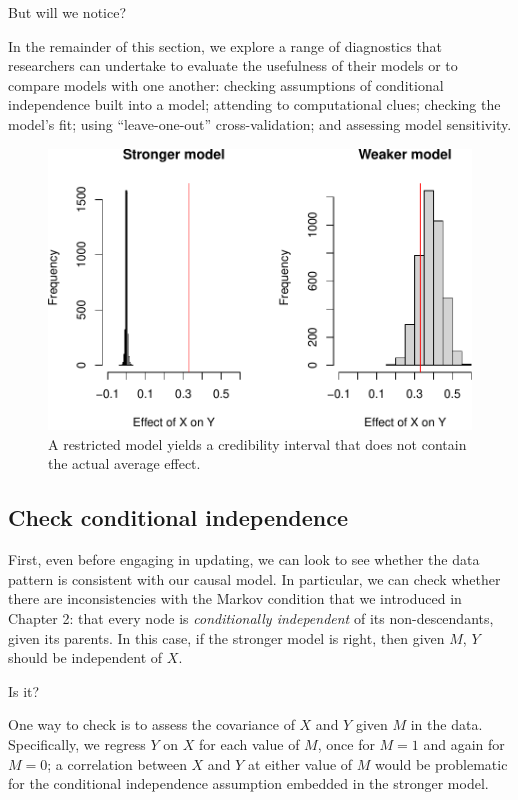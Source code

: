 \documentclass[
  12pt,
]{book}
\begin{document}
But will we notice?

In the remainder of this section, we explore a range of diagnostics that researchers can undertake to evaluate the usefulness of their models or to compare models with one another: checking assumptions of conditional independence built into a model; attending to computational clues; checking the model's fit; using ``leave-one-out'' cross-validation; and assessing model sensitivity.

\begin{figure}
\centering
\includegraphics{ii_files/figure-latex/15badmodels-1.pdf}
\caption{\label{fig:15badmodels}A restricted model yields a credibility interval that does not contain the actual average effect.}
\end{figure}

\hypertarget{check-conditional-independence}{%
\subsection{Check conditional independence}\label{check-conditional-independence}}

First, even before engaging in updating, we can look to see whether the data pattern is consistent with our causal model. In particular, we can check whether there are inconsistencies with the Markov condition that we introduced in Chapter 2: that every node is \emph{conditionally independent} of its non-descendants, given its parents. In this case, if the stronger model is right, then given \(M\), \(Y\) should be independent of \(X\).

Is it?

One way to check is to assess the covariance of \(X\) and \(Y\) given \(M\) in the data. Specifically, we regress \(Y\) on \(X\) for each value of \(M\), once for \(M=1\) and again for \(M=0\); a correlation between \(X\) and \(Y\) at either value of \(M\) would be problematic for the conditional independence assumption embedded in the stronger model.
\end{document}
